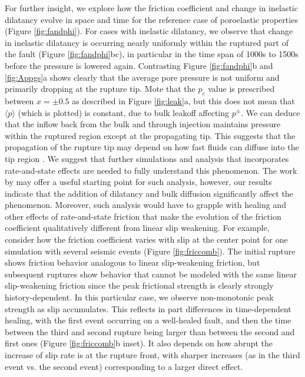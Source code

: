 \documentclass[draft]{agujournal2019}
\begin{document}
For further insight, we explore how the friction coefficient and change in inelastic dilatancy evolve in space and time for the reference case of poroelastic properties (Figure \ref{fig:fandphi}). For cases with inelastic dilatancy, we observe that change in inelastic dilatancy is occurring nearly uniformly within the ruptured part of the fault (Figure \ref{fig:fandphi}bc), in particular in the time span of 1000s to 1500s before the pressure is lowered again. Contrasting Figure \ref{fig:fandphi}b and \ref{fig:Appgs}a shows clearly that the average pore pressure is not uniform and primarily dropping at the rupture tip. Mote that the $p_c$ value is prescribed between $x = \pm 0.5$ as described in Figure \ref{fig:leak}a, but this does not mean that $\langle p \rangle$ (which is plotted) is constant, due to bulk leakoff affecting $p^\pm$. We can deduce that the inflow back from the bulk and through injection maintains pressure within the ruptured region except at the propagating tip. This suggests that the propagation of the rupture tip may depend on how fast fluids can diffuse into the tip region \cite{Ciardo2019,Brantut2021}. We suggest that further simulations and analysis that incorporates rate-and-state effects are needed to fully understand this phenomenon. The work by \cite{Garagash2020} may offer a useful starting point for such analysis, however, our results indicate that the addition of dilatancy and bulk diffusion significantly affect the phenomenon. Moreover, such analysis would have to grapple with healing and other effects of rate-and-state friction that make the evolution of the friction coefficient qualitatively different from linear slip weakening.  For example, consider how the friction coefficient varies with slip at the center point for one simulation with several seismic events (Figure \ref{fig:friccomb}). The initial rupture shows friction behavior analogous to linear slip-weakening friction, but subsequent ruptures show behavior that cannot be modeled with the same linear slip-weakening friction since the peak frictional strength is clearly strongly history-dependent. In this particular case, we observe non-monotonic peak strength as slip accumulates. This reflects in part differences in time-dependent healing, with the first event occurring on a well-healed fault, and then the time between the third and second rupture being larger than between the second and first ones (Figure \ref{fig:friccomb}b inset).  It also depends on how abrupt the increase of slip rate is at the rupture front, with sharper increases (as in the third event vs. the second event) corresponding to a larger direct effect.  
\end{document}
